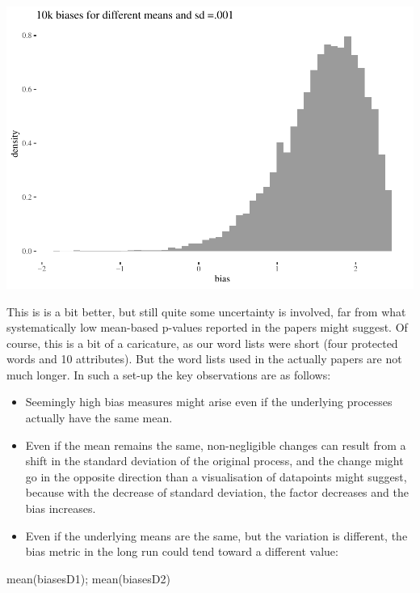 \documentclass[
  10pt,
  dvipsnames,enabledeprecatedfontcommands]{scrartcl}
\newenvironment{Shaded}{\begin{snugshade}}{\end{snugshade}}
\newcommand{\FunctionTok}[1]{\textcolor[rgb]{0.00,0.00,0.00}{#1}}
\newcommand{\NormalTok}[1]{#1}
\begin{document}
\begin{center}\includegraphics[width=1\linewidth]{paperDraft_files/figure-latex/unnamed-chunk-16-1} \end{center}
\normalsize

This is is a bit better, but still quite some uncertainty is involved,
far from what systematically low mean-based p-values reported in the
papers might suggest. Of course, this is a bit of a caricature, as our
word lists were short (four protected words and 10 attributes). But the
word lists used in the actually papers are not much longer. In such a
set-up the key observations are as follows:

\begin{itemize}
\item
  Seemingly high bias measures might arise even if the underlying
  processes actually have the same mean.
\item
  Even if the mean remains the same, non-negligible changes can result
  from a shift in the standard deviation of the original process, and
  the change might go in the opposite direction than a visualisation of
  datapoints might suggest, because with the decrease of standard
  deviation, the factor decreases and the bias increases.
\item
  Even if the underlying means are the same, but the variation is
  different, the bias metric in the long run could tend toward a
  different value:
\end{itemize}

\vspace{1mm}
\footnotesize

\begin{Shaded}
\begin{Highlighting}[]
\FunctionTok{mean}\NormalTok{(biasesD1); }\FunctionTok{mean}\NormalTok{(biasesD2)}
\end{Highlighting}
\end{Shaded}
\end{document}
